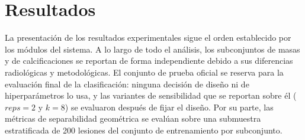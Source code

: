 
\newpage
\section{Resultados}
\label{sec:resultados}

La presentación de los resultados experimentales sigue el orden establecido por los
módulos del sistema. A lo largo de todo el análisis, los subconjuntos de masas y de
calcificaciones se reportan de forma independiente debido a sus diferencias radiológicas
y metodológicas. El conjunto de prueba oficial se reserva para la evaluación final de la clasificación: ninguna
decisión de diseño ni de hiperparámetros lo usa, y las variantes de sensibilidad que se reportan
sobre él ($\textit{reps} = 2$ y $k = 8$) se evaluaron después de fijar el diseño.
Por su parte, las métricas de separabilidad geométrica se evalúan sobre una submuestra
estratificada de 200 lesiones del conjunto de entrenamiento por subconjunto.
